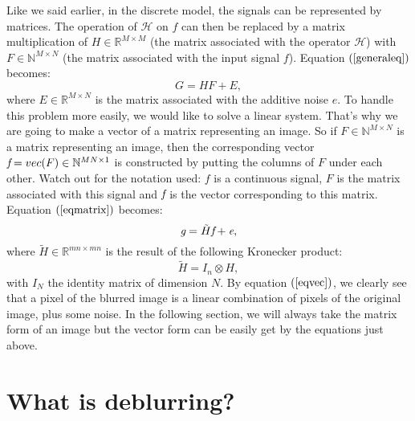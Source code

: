 Like we said earlier, in the discrete model, the signals can be represented by matrices. The operation of $\mathcal{H}$ on $f$ can then be replaced by a matrix multiplication of $H \in \mathbb{R}^{M \times M}$ (the matrix associated with the operator $\mathcal{H}$) with $F \in \mathbb{N}^{M \times N}$ (the matrix associated with the input signal $f$). Equation $(\ref{generaleq})$ becomes:
\begin{equation}
G = HF + E,
\label{eqmatrix}
\end{equation}
where $E \in \mathbb{R}^{M \times N}$ is the matrix associated with the additive noise $e$. To handle this problem more easily, we would like to solve a linear system. That's why we are going to make a vector of a matrix representing an image. So if $F \in \mathbb{N}^{M \times N}$ is a matrix representing an image, then the corresponding vector $\emph{f} = vec(F) \in \mathbb{N}^{MN \times 1}$ is constructed by putting the columns of $F$ under each other. Watch out for the notation used: $f$ is a continuous signal, $F$ is the matrix associated with this signal and $\emph{f}$  is the vector corresponding to this matrix. Equation $(\ref{eqmatrix})$ becomes:
\begin{equation}
\emph{g} = \tilde{H}\emph{f} + \emph{e},
\label{eqvec}
\end{equation}
where $\tilde{H} \in \mathbb{R}^{mn \times mn}$ is the result of the following Kronecker product:
\begin{equation}
\tilde{H} = I_n \otimes H,
\end{equation}
with $I_N$ the identity matrix of dimension $N$. By equation $(\ref{eqvec})$, we clearly see that a pixel of the blurred image is a linear combination of pixels of the original image, plus some noise. In the following section, we will always take the matrix form of an image but the vector form can be easily get by the equations just above.

\section{What is deblurring?}

